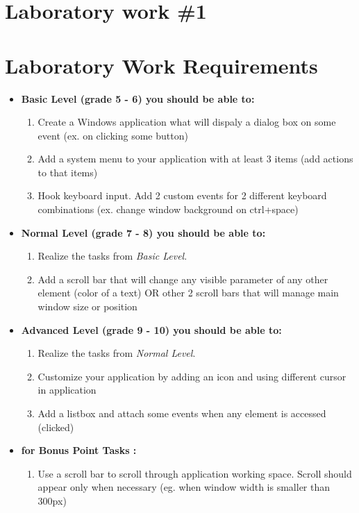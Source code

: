 \section*{Laboratory work \#1}

\section{Laboratory Work Requirements}
\begin{itemize}
\item \textbf{Basic Level (grade 5 - 6) you should be able to:}
	\begin{enumerate}
	\item Create a Windows application what will dispaly a dialog box on some event (ex. on clicking some button)
      \item Add a system menu to your application with at least 3 items (add actions to that items)
      \item Hook keyboard input. Add 2 custom events for 2 different keyboard combinations (ex. change window background on ctrl+space)
      \end{enumerate}
\item \textbf{Normal Level (grade 7 - 8) you should be able to:}
      \begin{enumerate}
    \item Realize the tasks from \textit{Basic Level}.
    \item Add a scroll bar that will change any visible parameter of any other element (color of a text) OR other 2 scroll bars that will manage main window size or position
          \end{enumerate}
\item \textbf{Advanced Level (grade 9 - 10) you should be able to:}
      \begin{enumerate}
    \item Realize the tasks from \textit{Normal Level}.
    \item Customize your application by adding an icon and using different cursor in application
    \item Add a listbox and attach some events when any element is accessed (clicked)
          \end{enumerate}
\item \textbf{for Bonus Point Tasks :}
\begin{enumerate}
	\item Use a scroll bar to scroll through application working space. Scroll should appear only when necessary (eg. when window width is smaller than 300px)
    \end{enumerate}
  \end{itemize}  

\clearpage